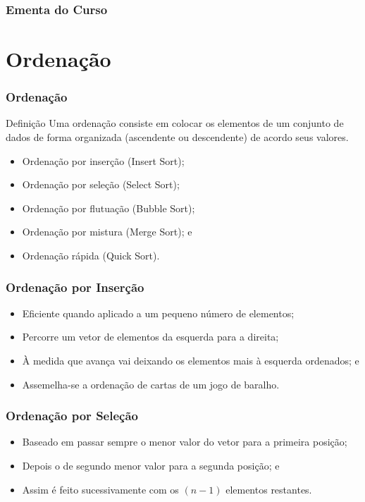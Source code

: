 \documentclass{beamer}
\begin{document}
\begin{frame}
	\frametitle{Ementa do Curso}
  	\tableofcontents
\end{frame}


\section{Ordenação}

\begin{frame}
\frametitle{Ordenação}

\begin{block}{Definição}
Uma ordenação consiste em colocar os elementos de um conjunto de dados
de forma organizada (ascendente ou descendente) de acordo seus valores.
\end{block}\vfill

\begin{itemize}
	\item Ordenação por inserção (Insert Sort);
	\item Ordenação por seleção (Select Sort);
	\item Ordenação por flutuação (Bubble Sort);
	\item Ordenação por mistura (Merge Sort); e
	\item Ordenação rápida (Quick Sort).
\end{itemize}

\end{frame}

\begin{frame}
	\frametitle{Ordenação por Inserção}
	
	\begin{itemize}
		\item Eficiente quando aplicado a um pequeno número de elementos;
		\item Percorre um vetor de elementos da esquerda para a direita;
		\item À medida que avança vai deixando os elementos mais à esquerda
		ordenados; e
		\item Assemelha-se a ordenação de cartas de um jogo de baralho.
	\end{itemize}
\end{frame}

\begin{frame}
\frametitle{Ordenação por Seleção}

\begin{itemize}
	\item Baseado em passar sempre o menor valor do vetor para a primeira posição;
	\item Depois o de segundo menor valor para a segunda posição; e
	\item Assim é feito sucessivamente com os $(n - 1)$ elementos restantes.
\end{itemize}
\end{frame}
\end{document}
